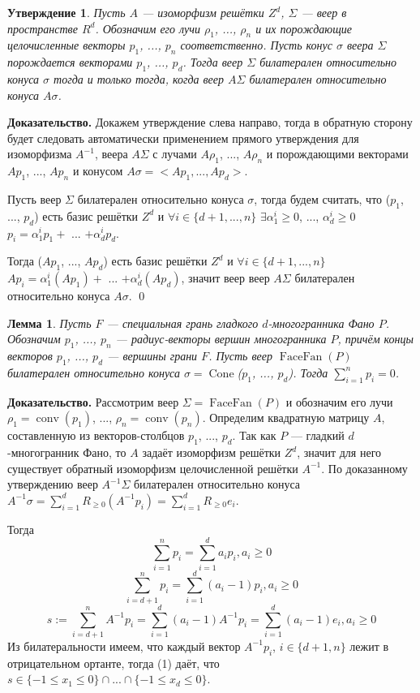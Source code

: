 \documentclass[12pt,notitlepage]{article}
\DeclareMathOperator{\conv}{conv}
\DeclareMathOperator{\FF}{FaceFan}
\DeclareMathOperator{\Cone}{Cone}
\newtheorem{statement}{Утверждение}
\newtheorem{lemma}{Лемма}
\begin{document}
	\begin{statement}
		Пусть $A$ --- изоморфизм решётки $Z^d$, $\Sigma$ --- веер в пространстве $R^d$. Обозначим его лучи $\rho_1$, ..., $\rho_n$ и их порождающие целочисленные векторы $p_1$, ..., $p_n$ соответственно. Пусть конус $\sigma$ веера $\Sigma$ порождается векторами $p_1$, ..., $p_d$. Тогда веер $\Sigma$ билатерален относительно конуса $\sigma$ тогда и только тогда, когда веер $A\Sigma$ билатерален относительно конуса $A\sigma$.
	\end{statement}
	
	\textbf{Доказательство.} Докажем утверждение слева направо, тогда в обратную сторону будет следовать автоматически применением прямого утверждения для изоморфизма $A^{-1}$, веера $A\Sigma$ с лучами $A\rho_1$, ..., $A\rho_n$ и порождающими векторами $Ap_1$, ..., $Ap_n$ и конусом $A\sigma = <Ap_1, ..., Ap_d>$.
	
	Пусть веер $\Sigma$ билатерален относительно конуса $\sigma$, тогда будем считать, что ($p_1$, ..., $p_d$) есть базис решётки $Z^d$ и $\forall i \in \{d + 1, ..., n\}$ $\exists \alpha_1^i \geq 0$, ..., $\alpha_d^i \geq 0$ $p_i = \alpha_1^i p_1 +$ ... $+ \alpha_d^i p_d$.
	
	Тогда ($Ap_1$, ..., $Ap_d$) есть базис решётки $Z^d$ и $\forall i \in \{d + 1, ..., n\}$ $Ap_i = \alpha_1^i (Ap_1) +$ ... $+ \alpha_d^i (Ap_d)$, значит веер веер $A\Sigma$ билатерален относительно конуса $A\sigma$. \qed
	
	\begin{lemma}
		Пусть $F$ --- специальная грань гладкого $d$-многогранника Фано $P$. Обозначим $p_1$, ..., $p_n$ --- радиус-векторы вершин многогранника $P$, причём концы векторов $p_1$, ..., $p_d$ --- вершины грани $F$. Пусть веер $\FF(P)$ билатерален относительно конуса $\sigma = \Cone$($p_1$, ..., $p_d$). Тогда $\sum_{i = 1}^{n} p_i = 0$.
	\end{lemma}
	
	\textbf{Доказательство.} Рассмотрим веер $\Sigma=\FF(P)$ и обозначим его лучи $\rho_1 = \conv(p_1)$, ..., $\rho_n = \conv(p_n)$. Определим квадратную матрицу $A$, составленную из векторов-столбцов $p_1$, ..., $p_d$. Так как $P$ --- гладкий $d$-многогранник Фано, то $A$ задаёт изоморфизм решётки $Z^d$, значит для него существует обратный изоморфизм целочисленной решётки $A^{-1}$. По доказанному утверждению веер $A^{-1}\Sigma$ билатерален относительно конуса $A^{-1}\sigma = \sum_{i=1}^{d} R_{\geq 0} (A^{-1}p_i) = \sum_{i=1}^{d} R_{\geq 0} e_i$.
	
	Тогда
	\[
	\sum_{i = 1}^{n} p_i = \sum_{i = 1}^{d} a_i p_i, a_i \geq 0
	\]
	\[
	\sum_{i = d + 1}^{n} p_i = \sum_{i = 1}^{d} (a_i - 1) p_i, a_i \geq 0
	\]
	\[
	s := \sum_{i = d + 1}^{n} A^{-1}p_i = \sum_{i = 1}^{d} (a_i - 1) A^{-1}p_i = \sum_{i = 1}^{d} (a_i - 1) e_i, a_i \geq 0 \tag{1} \label{bseeq}
	\]
	Из билатеральности имеем, что каждый вектор $A^{-1}p_i$, $i \in \{d + 1, n\}$ лежит в отрицательном ортанте, тогда (1) даёт, что $s \in \{-1 \leq x_1 \leq 0\} \cap ... \cap \{ -1 \leq x_d \leq 0\}$.
	
\end{document}
